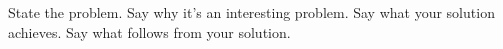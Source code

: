 
State the problem. %
Say why it’s an interesting problem. %
Say what your solution achieves. %
Say what follows from your solution. %